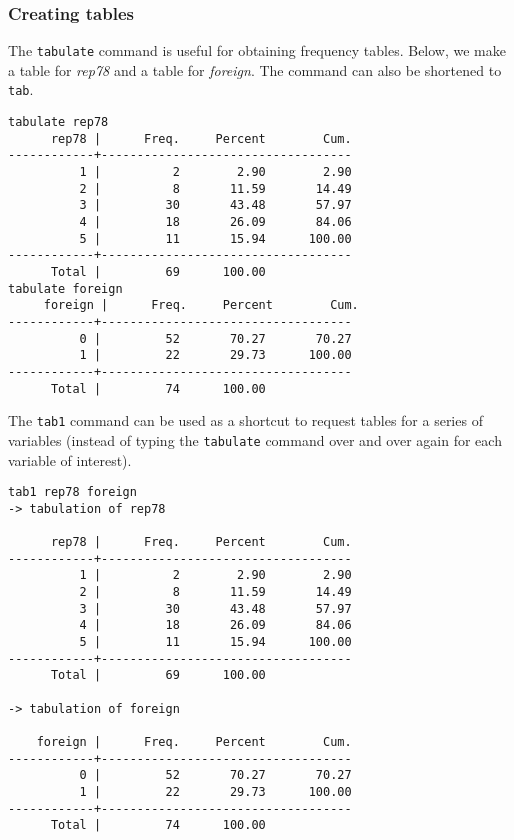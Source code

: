 \subsubsection{Creating tables}

The \lstinline{tabulate} command is useful for obtaining frequency tables. Below, we make a table for \textit{rep78} and a table for \textit{foreign}. The command can also be shortened to \lstinline{tab}.

\begin{lstlisting}
tabulate rep78
      rep78 |      Freq.     Percent        Cum.
------------+-----------------------------------
          1 |          2        2.90        2.90
          2 |          8       11.59       14.49
          3 |         30       43.48       57.97
          4 |         18       26.09       84.06
          5 |         11       15.94      100.00
------------+-----------------------------------
      Total |         69      100.00
tabulate foreign
     foreign |      Freq.     Percent        Cum.
------------+-----------------------------------
          0 |         52       70.27       70.27
          1 |         22       29.73      100.00
------------+-----------------------------------
      Total |         74      100.00
\end{lstlisting}

The \lstinline{tab1} command can be used as a shortcut to request tables for a series of variables (instead of typing the \lstinline{tabulate} command over and over again for each variable of interest).

\begin{lstlisting}
tab1 rep78 foreign
-> tabulation of rep78

      rep78 |      Freq.     Percent        Cum.
------------+-----------------------------------
          1 |          2        2.90        2.90
          2 |          8       11.59       14.49
          3 |         30       43.48       57.97
          4 |         18       26.09       84.06
          5 |         11       15.94      100.00
------------+-----------------------------------
      Total |         69      100.00

-> tabulation of foreign

    foreign |      Freq.     Percent        Cum.
------------+-----------------------------------
          0 |         52       70.27       70.27
          1 |         22       29.73      100.00
------------+-----------------------------------
      Total |         74      100.00
\end{lstlisting}


